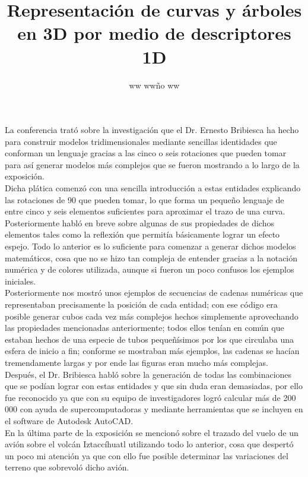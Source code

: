 \documentclass{article}
\title{Representación de curvas y árboles en 3D por medio de descriptores 1D}
\author{ww ww\~no ww}
\date{} %
\begin{document}
	\maketitle
	\normalsize{
La conferencia trató sobre la investigación que el Dr. Ernesto Bribiesca ha hecho para construir modelos tridimensionales mediante sencillas identidades que conforman un lenguaje gracias a las cinco o seis rotaciones que pueden tomar para así generar modelos más complejos que se fueron mostrando a lo largo de la exposición.
\\

Dicha plática comenzó con una sencilla introducción a estas entidades explicando las rotaciones de 90 que pueden tomar, lo que forma un pequeño lenguaje de entre cinco y seis elementos suficientes para aproximar el trazo de una curva. Posteriormente habló en breve sobre algunas de sus propiedades de dichos elementos tales como la reflexión que permitía básicamente lograr un efecto espejo. Todo lo anterior es lo suficiente para comenzar a generar dichos modelos matemáticos, cosa que no se hizo tan compleja de entender gracias a la notación numérica y de colores utilizada, aunque si fueron un poco confusos los ejemplos iniciales.
\\

Posteriormente nos mostró unos ejemplos de secuencias de cadenas numéricas que representaban precisamente la posición de cada entidad; con ese código era posible generar cubos cada vez más complejos hechos simplemente aprovechando las propiedades mencionadas anteriormente; todos ellos tenían en común que estaban hechos de una especie de tubos pequeñísimos por los que circulaba una esfera de inicio a fin; conforme se mostraban más ejemplos, las cadenas se hacían tremendamente largas y por ende las figuras eran mucho más complejas.
\\

Después, el Dr. Bribiesca habló sobre la generación de todas las combinaciones que se podían lograr con estas entidades y que sin duda eran demasiadas, por ello fue reconocido ya que con su equipo de investigadores logró calcular más de 200 000 con ayuda de supercomputadoras y mediante herramientas que se incluyen en el software de Autodesk AutoCAD.
\\

En la última parte de la exposición se mencionó sobre el trazado del vuelo de un avión sobre el volcán Iztaccíhuatl utilizando todo lo anterior, cosa que despertó un poco mi atención ya que con ello fue posible determinar las variaciones del terreno que sobrevoló dicho avión.
\\

}
\end{document}
